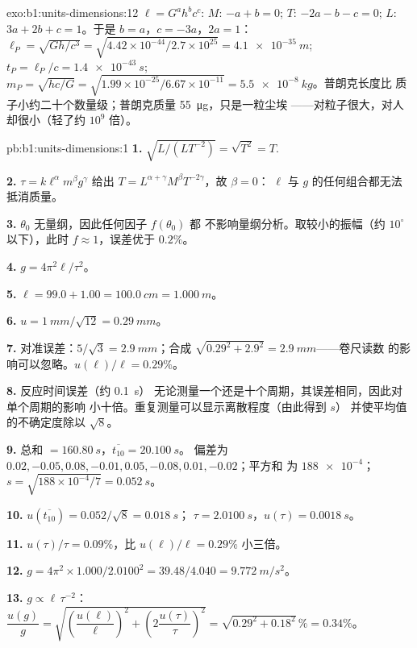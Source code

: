 \begin{solution}{exo:b1:units-dimensions:12}
$\ell = G^a h^b c^c$: $M$: $-a + b = 0$; $T$: $-2a - b - c = 0$; $L$:
$3a + 2b + c = 1$。于是 $b = a$，$c = -3a$，$2a = 1$：
$\ell_P = \sqrt{Gh/c^3} = \sqrt{4.42\times10^{-44}/2.7\times10^{25}}
= \qty{4.1e-35}{m}$; $t_P = \ell_P/c = \qty{1.4e-43}{s}$;
$m_P = \sqrt{hc/G} = \sqrt{1.99\times10^{-25}/6.67\times10^{-11}}
= \qty{5.5e-8}{kg}$。普朗克长度比
质子小约二十个数量级；普朗克质量 \qty{55}{\micro g}，只是一粒尘埃
——对粒子很大，对人却很小（轻了约 $10^9$ 倍）。
\end{solution}

\begin{solution}{pb:b1:units-dimensions:1}
\textbf{1.} $\sqrt{L/(L T^{-2})} = \sqrt{T^2} = T$.

\textbf{2.} $\tau = k\ell^\alpha m^\beta g^\gamma$ 给出
$T = L^{\alpha+\gamma} M^\beta T^{-2\gamma}$，故 $\beta = 0$：
$\ell$ 与 $g$ 的任何组合都无法抵消质量。

\textbf{3.} $\theta_0$ 无量纲，因此任何因子 $f(\theta_0)$ 都
不影响量纲分析。取较小的振幅（约
$10^\circ$ 以下），此时 $f \approx 1$，误差优于 $0.2\%$。

\textbf{4.} $g = 4\pi^2\ell/\tau^2$。

\textbf{5.} $\ell = 99.0 + 1.00 = \qty{100.0}{cm} = \qty{1.000}{m}$。

\textbf{6.} $u = \qty{1}{mm}/\sqrt{12} = \qty{0.29}{mm}$。

\textbf{7.} 对准误差：$5/\sqrt3 = \qty{2.9}{mm}$；合成
$\sqrt{0.29^2 + 2.9^2} = \qty{2.9}{mm}$——卷尺读数
的影响可以忽略。$u(\ell)/\ell = 0.29\%$。

\textbf{8.} 反应时间误差（约 \qty{0.1}{s}）
无论测量一个还是十个周期，其误差相同，因此对单个周期的影响
小十倍。重复测量可以显示离散程度（由此得到 $s$）
并使平均值的不确定度除以 $\sqrt8$。

\textbf{9.} 总和 $= \qty{160.80}{s}$，$\overline{t_{10}} = \qty{20.100}{s}$。
偏差为 $0.02, -0.05, 0.08, -0.01, 0.05, -0.08, 0.01, -0.02$；平方和
为 $\num{188e-4}$；$s = \sqrt{188\times10^{-4}/7} = \qty{0.052}{s}$。

\textbf{10.} $u(\overline{t_{10}}) = 0.052/\sqrt8 = \qty{0.018}{s}$；
$\tau = \qty{2.0100}{s}$，$u(\tau) = \qty{0.0018}{s}$。

\textbf{11.} $u(\tau)/\tau = 0.09\%$，比
$u(\ell)/\ell = 0.29\%$ 小三倍。

\textbf{12.} $g = 4\pi^2 \times 1.000/2.0100^2 = 39.48/4.040 =
\qty{9.772}{m/s^2}$。

\textbf{13.} $g \propto \ell\,\tau^{-2}$：
$\dfrac{u(g)}{g} = \sqrt{\left(\dfrac{u(\ell)}{\ell}\right)^2
+ \left(2\dfrac{u(\tau)}{\tau}\right)^2} = \sqrt{0.29^2 + 0.18^2}\,\%
= 0.34\%$。


\end{solution}
